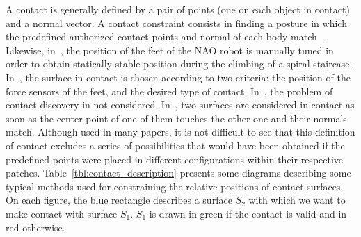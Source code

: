 A contact is generally defined by a pair of points (one on each object in contact) and a normal vector.
A contact constraint consists in finding a posture in which the predefined authorized contact points and normal of each body match~\cite{zhang:TePRA:2013}\cite{hauser:ijrr:2008}.
Likewise, in~\cite{osswald:iros:2011}, the position of the feet of the NAO robot is manually tuned in order to obtain statically stable position during the climbing of a spiral staircase.
In~\cite{Chestnutt:2009:BNR:1733023.1733314}, the surface in contact is chosen according to two criteria: the position of the force sensors of the feet, and the desired type of contact.
In~\cite{sentis:itro:2010}, the problem of contact discovery in not considered.
In~\cite{mordatch:acm:2012}, two surfaces are considered in contact as soon as the center point of one of them touches the other one and their normals match.
Although used in many papers, it is not difficult to see that this definition of contact excludes a series of possibilities that would have been obtained if the predefined points were placed in different configurations within their respective patches.
Table~\ref{tbl:contact_description} presents some diagrams describing some typical methods used for constraining the relative positions of contact surfaces.
On each figure, the blue rectangle describes a surface $S_2$ with which we want to make contact with surface $S_1$.
$S_1$ is drawn in green if the contact is valid and in red otherwise.

